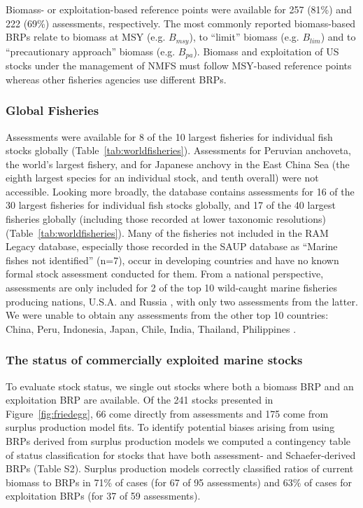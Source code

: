 Biomass- or exploitation-based reference points were available for
257 (81\%) and
222 (69\%)
assessments, respectively. The most commonly reported biomass-based
BRPs relate to biomass at MSY (e.g. $B_{msy}$), to ``limit'' biomass
(e.g. $B_{lim}$) and to ``precautionary approach'' biomass (e.g.
$B_{pa}$). Biomass and exploitation of US stocks under the management
of NMFS must follow MSY-based reference points whereas other fisheries
agencies use different BRPs.

\subsubsection*{Global Fisheries}
Assessments were available for 8 of the 10 largest fisheries for
individual fish stocks globally (Table~\ref{tab:worldfisheries}). Assessments for Peruvian
anchoveta, the world's largest fishery, and for Japanese anchovy in
the East China Sea (the eighth largest species for an individual
stock, and tenth overall) were not accessible. Looking more broadly,
the database contains assessments for 16 of the 30 largest fisheries
for individual fish stocks globally, and 17 of the 40 largest
fisheries globally (including those recorded at lower taxonomic
resolutions) (Table~\ref{tab:worldfisheries}). Many of the fisheries not included in the RAM
Legacy database, especially those recorded in the SAUP database as
``Marine fishes not identified'' (n=7), occur in developing countries
and have no known formal stock assessment conducted for them.  From a
national perspective, assessments are only included for 2 of the top
10 wild-caught marine fisheries producing nations, U.S.A. and Russia
\citep{FAO:sofia}, with only two assessments from the latter. We were unable
to obtain any assessments from the other top 10 countries: China,
Peru, Indonesia, Japan, Chile, India, Thailand, Philippines \citep{FAO:sofia}.



\subsubsection*{The status of commercially exploited marine stocks }
To evaluate stock status, we single out stocks where both a biomass
BRP and an exploitation BRP are available. Of the
241 stocks presented in
Figure~\ref{fig:friedegg}, 66 come
directly from assessments and 175 come
from surplus production model fits. To identify potential biases
arising from using BRPs derived from surplus production models we
computed a contingency table of status classification for stocks that
have both assessment- and Schaefer-derived BRPs (Table S2). Surplus
production models correctly classified ratios of current biomass to
BRPs in 71\% of cases (for
67 of 95 assessments) and
63\% of cases for exploitation BRPs (for
37 of 59 assessments).

